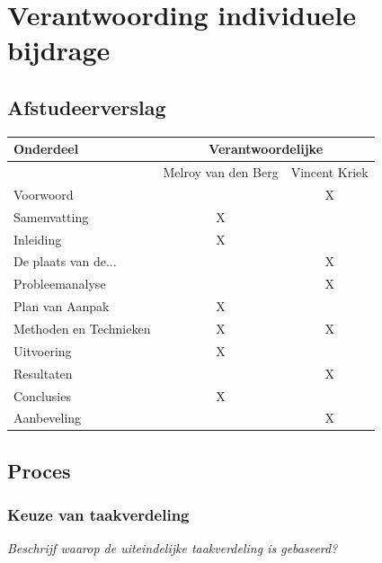 \documentclass[]{article}
\begin{document}
\section{Verantwoording individuele bijdrage}

\subsection{Afstudeerverslag}
\begin{tabular}{|| l | c | c ||}\hline
    Onderdeel              &   \multicolumn{2}{|c||}{Verantwoordelijke} \\\hline
                           & Melroy van den Berg & Vincent Kriek        \\\hline\hline
    Voorwoord              &                     &  X                   \\\hline
    Samenvatting           &       X             &                      \\\hline
    Inleiding              &       X             &                      \\\hline
    De plaats van de...    &                     &  X                   \\\hline
    Probleemanalyse        &                     &  X                   \\\hline
    Plan van Aanpak        &       X             &                      \\\hline
    Methoden en Technieken &       X             &  X                   \\\hline
    Uitvoering             &       X             &                      \\\hline
    Resultaten             &                     &  X                   \\\hline
    Conclusies             &       X             &                      \\\hline
    Aanbeveling            &                     &  X                   \\\hline
\end{tabular}              

\subsection{Proces}
\subsubsection{Keuze van taakverdeling}
\label{taakverdeling}
\textit{Beschrijf waarop de uiteindelijke taakverdeling is gebaseerd?}
\end{document}
